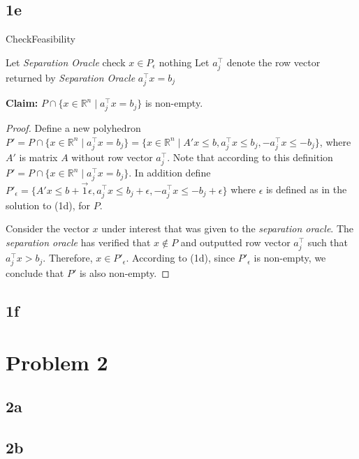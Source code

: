 \documentclass{article}
\begin{document}
\subsection*{1e}\begin{algorithm}[H]
\caption{{\sc CheckFeasibility}}
\begin{algorithmic}[1]
\State Let {\em Separation Oracle} check $x\in P_{\epsilon}$
\Return nothing
\Else
\State Let $a_j^{\intercal}$ denote the row vector returned by {\em Separation Oracle}
\State \Return $a_j^{\intercal}x = b_j$
\EndIf
\end{algorithmic}
\end{algorithm}
\textbf{Claim:} $P\cap \{x\in\mathbb{R}^n\mid a_j^{\intercal}x = b_j\}$ is non-empty.
\begin{proof}
  Define a new polyhedron $P' = P\cap \{x\in\mathbb{R}^n\mid a_j^{\intercal}x = b_j\} =
  \{x\in\mathbb{R}^n\mid A'x \leq b, a_j^{\intercal}x \leq b_j, -a_j^{\intercal}x \leq -b_j \}$,
  where $A'$ is matrix $A$ without row vector $a_j^{\intercal}$. Note that according to
  this definition $P' = P\cap \{x\in\mathbb{R}^n\mid a_j^{\intercal}x = b_j\}$.
  In addition define $P'_{\epsilon} = \{A'x\leq b + \vec{1}\epsilon, a_j^{\intercal}x \leq b_j
  + \epsilon, -a_j^{\intercal}x \leq -b_j + \epsilon\}$ where $\epsilon$ is defined as in the
  solution to (1d), for $P$.

  Consider the vector $x$ under interest that was given to the {\em separation oracle}.
  The {\em separation oracle}
  has verified that $x\notin P$ and outputted row vector $a_j^{\intercal}$ such that $a_j^{\intercal}x > b_j$. Therefore, $x\in P'_{\epsilon}$. According to (1d), since $P'_{\epsilon}$ is non-empty, we conclude that $P'$ is also non-empty. 
\end{proof}
\subsection*{1f}
\section*{Problem 2}
\subsection*{2a}
\subsection*{2b}
\end{document}
